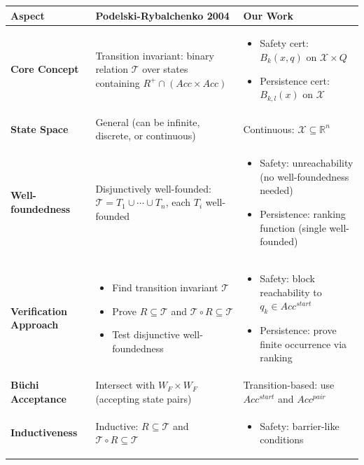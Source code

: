 \documentclass{article}
\begin{document}
\begin{center}
\begin{tabular}{|p{3.5cm}|p{5.5cm}|p{5.5cm}|}
\hline
\textbf{Aspect} & \textbf{Podelski-Rybalchenko 2004} & \textbf{Our Work} \\
\hline
\textbf{Core Concept} & Transition invariant: binary relation $\mathcal{T}$ over states containing $R^+ \cap (Acc \times Acc)$ &
\begin{itemize}
\item Safety cert: $B_k(x,q)$ on $\mathcal{X} \times Q$
\item Persistence cert: $B_{k,l}(x)$ on $\mathcal{X}$
\end{itemize} \\
\hline
\textbf{State Space} & General (can be infinite, discrete, or continuous) & Continuous: $\mathcal{X} \subseteq \mathbb{R}^n$ \\
\hline
\textbf{Well-foundedness} & Disjunctively well-founded: $\mathcal{T} = T_1 \cup \cdots \cup T_n$, each $T_i$ well-founded &
\begin{itemize}
\item Safety: unreachability (no well-foundedness needed)
\item Persistence: ranking function (single well-founded)
\end{itemize} \\
\hline
\textbf{Verification Approach} &
\begin{itemize}
\item Find transition invariant $\mathcal{T}$
\item Prove $R \subseteq \mathcal{T}$ and $\mathcal{T} \circ R \subseteq \mathcal{T}$
\item Test disjunctive well-foundedness
\end{itemize} &
\begin{itemize}
\item Safety: block reachability to $q_k \in Acc^{start}$
\item Persistence: prove finite occurrence via ranking
\end{itemize} \\
\hline
\textbf{Büchi Acceptance} & Intersect with $W_F \times W_F$ (accepting state pairs) & Transition-based: use $Acc^{start}$ and $Acc^{pair}$ \\
\hline
\textbf{Inductiveness} & Inductive: $R \subseteq \mathcal{T}$ and $\mathcal{T} \circ R \subseteq \mathcal{T}$ &
\begin{itemize}
\item Safety: barrier-like conditions

\end{itemize}
\end{tabular}
\end{center}
\end{document}
